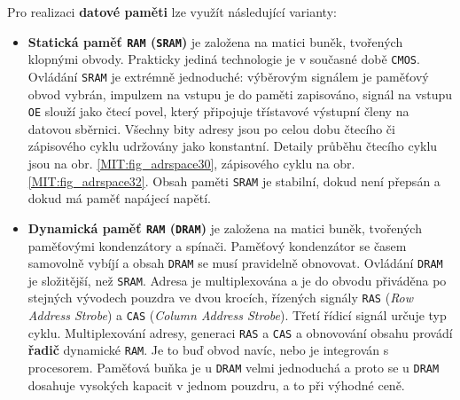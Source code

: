       Pro realizaci \textbf{datové paměti} lze využít následující varianty:
      \begin{itemize}\addtolength{\itemsep}{-0.5\baselineskip}
        \item \textbf{Statická paměť \texttt{RAM} (\texttt{SRAM})} je založena na matici buněk,  
              tvořených klopnými obvody. Prakticky jediná technologie je v současné době 
              \texttt{CMOS}. Ovládání \texttt{SRAM} je extrémně jednoduché: výběrovým signálem 
               je paměťový  obvod vybrán, impulzem na vstupu 
               je do paměti zapisováno, signál na vstupu            
              \texttt{OE} slouží jako čtecí povel, který připojuje třístavové výstupní členy na 
              datovou sběrnici. Všechny bity adresy jsou po celou dobu čtecího či zápisového cyklu 
              udržovány jako konstantní. Detaily průběhu čtecího cyklu jsou na obr. 
              \ref{MIT:fig_adrspace30}, zápisového  cyklu na obr. \ref{MIT:fig_adrspace32}. Obsah 
              paměti \texttt{SRAM} je stabilní, dokud není přepsán a dokud má paměť napájecí napětí.
        \item \textbf{Dynamická paměť \texttt{RAM} (\texttt{DRAM})} je založena na matici buněk,  
              tvořených paměťovými kondenzátory a spínači. Paměťový kondenzátor se časem samovolně 
              vybíjí a obsah \texttt{DRAM} se musí pravidelně obnovovat. Ovládání \texttt{DRAM} je 
              složitější, než \texttt{SRAM}. Adresa je multiplexována a je do obvodu přiváděna po 
              stejných vývodech pouzdra ve dvou krocích, řízených signály \texttt{RAS} (\emph{Row 
              Address Strobe}) a \texttt{CAS} (\emph{Column Address Strobe}). Třetí řídicí signál 
               určuje typ cyklu. Multiplexování adresy, generaci 
              \texttt{RAS} a \texttt{CAS} a obnovování obsahu provádí \textbf{řadič} dynamické 
              \texttt{RAM}. Je to buď obvod navíc, nebo je integrován s procesorem. 
              Paměťová buňka je u \texttt{DRAM} velmi jednoduchá a proto se u \texttt{DRAM} 
              dosahuje vysokých kapacit v jednom pouzdru, a to při výhodné ceně.
      \end{itemize}
      
